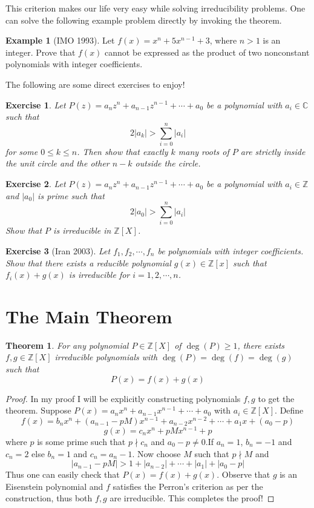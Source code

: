 \documentclass[11pt]{article}
\newtheorem*{theorem*}{Theorem}
\newtheorem{exercise}{Exercise}[section]
\theoremstyle{definition} %
\newtheorem{example}{Example}[section]
\begin{document}
This criterion makes our life very easy while solving irreducibility problems. One can solve the following example problem directly by invoking the theorem.
\begin{example}[IMO 1993]
     Let $f(x) = x^n + 5x^{n-1} + 3$, where $n > 1$ is an integer. Prove that $f(x)$ cannot be expressed
    as the product of two nonconstant polynomials with integer coefficients.
\end{example}
The following are some direct exercises to enjoy!
\begin{exercise}
Let $P(z)=a_nz^n+a_{n-1}z^{n-1}+\cdots+a_0$ be a polynomial with $a_i\in \mathbb{C}$ such that 
$$2|a_k|>\sum_{i=0}^n|a_i|$$ for some $0\le k\le n$. Then show that exactly $k$ many roots of $P$ are strictly inside the unit circle and the 
other $n-k$ outside the circle.
\end{exercise}

\begin{exercise}
    Let $P(z)=a_nz^n+a_{n-1}z^{n-1}+\cdots+a_0$ be a polynomial with $a_i\in \mathbb{Z}$ and $|a_0|$ is prime such that 
    $$2|a_0|>\sum_{i=0}^n|a_i|$$ Show that $P$ is irreducible in $\mathbb{Z}[X]$.
\end{exercise}

\begin{exercise}[Iran 2003]
     Let $f_1,f_2,\cdots,f_n$ be polynomials with integer coefficients. Show that there exists a reducible
     polynomial $g(x)\in \mathbb{Z}[x]$ such that $f_i(x)+g(x)$ is irreducible for $i=1,2,\cdots,n$.
\end{exercise}

\section{The Main Theorem}
\begin{theorem*}
    For any polynomial $P\in \mathbb{Z}[X]$ of $\deg(P)\ge 1$, there exists $f,g\in \mathbb{Z}[X]$ irreducible polynomials with $\deg(P)=\deg(f)=\deg(g)$ such that 
    $$P(x)=f(x)+g(x)$$
\end{theorem*}
\begin{proof}
    In my proof I will be explicitly constructing polynomials $f,g$ to get the theorem. Suppose 
    $P(x)=a_nx^n+a_{n-1}x^{n-1}+\cdots+a_0$ with $a_i\in \mathbb{Z}[X]$. Define $$f(x)=b_nx^n+(a_{n-1}-pM) x^{n-1}+a_{n-2}x^{n-2}+\cdots+a_1x+(a_0-p)$$ $$g(x)=c_nx^n+pMx^{n-1}+p$$ where 
    $p$ is some prime such that $p\nmid c_n$ and $a_0-p\neq 0$.\newpage If $a_n=1$, $b_n=-1$ and $c_n=2$ else $b_n=1$ and $c_n=a_n-1$. Now choose $M$ such that $p\nmid M$ and 
    $$|a_{n-1}-pM|>1+|a_{n-2}|+\cdots+|a_1|+|a_0-p|$$ Thus one can easily check that $P(x)=f(x)+g(x)$. Observe that $g$ is an Eisenstein polynomial and $f$ satisfies the Perron's criterion as per the construction, thus both $f,g$ are irreducible.
    This completes the proof!
\end{proof}
\end{document}
